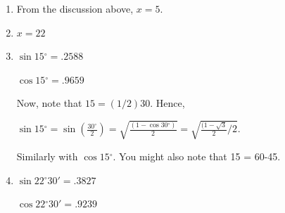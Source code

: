 \documentclass[english]{book}
\newcommand{\degrees}{\ensuremath{^{\circ}}}
\begin{document}
\begin{enumerate}
  \item[\hspace{1cm}16)] From the discussion above, $x = 5$.
  \item[\hspace{1cm}17)] $x = 22$
  \item[\hspace{1cm}18)] $\sin 15 \degrees = .2588$

       $\cos 15 \degrees = .9659$

       Now, note that $15 = (1/2) 30$. Hence,

       $\sin 15 \degrees = \sin (\frac{30 \degrees}{2}) = \sqrt{\frac{(1 - \cos 30 \degrees)}{2}} = \sqrt{ \frac{(1-\sqrt{3} }{2}/2 }$.

       Similarly with $\cos 15 \degrees$. You might also note that 15 = 60-45.
  \item[\hspace{1cm}19)]  $\sin 22 \degrees 30' = .3827$

       $\cos 22 \degrees 30' = .9239$


\end{enumerate}
\end{document}
